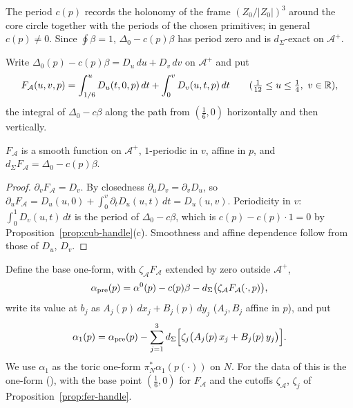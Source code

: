 The period $c(p)$ records the holonomy of the frame $(Z_0/|Z_0|)^3$ around the core circle together with the periods of the
chosen primitives; in general $c(p)\ne0$. Since $\oint\beta=1$, $\Delta_0-c(p)\beta$ has period zero and is $d_\Sigma$-exact on
$\mathcal A^+$.

\begin{definition}\label{def:fer-FA}
Write $\Delta_0(p)-c(p)\beta=D_u\,du+D_v\,dv$ on $\mathcal A^+$ and put
\[
 F_{\mathcal A}(u,v,p)=\int_{1/6}^uD_u(t,0,p)\,dt+\int_0^vD_v(u,t,p)\,dt\qquad(\tfrac1{12}\le u\le\tfrac14,\ v\in\mathbb{R}),
\]
the integral of $\Delta_0-c\beta$ along the path from $(\frac16,0)$ horizontally and then vertically.
\end{definition}

\begin{lemma}\label{lem:fer-FA}
$F_{\mathcal A}$ is a smooth function on $\mathcal A^+$, $1$-periodic in $v$, affine in $p$, and
$d_\Sigma F_{\mathcal A}=\Delta_0-c(p)\beta$.
\end{lemma}

\begin{proof}
$\partial_vF_{\mathcal A}=D_v$. By closedness $\partial_uD_v=\partial_vD_u$, so
$\partial_uF_{\mathcal A}=D_u(u,0)+\int_0^v\partial_tD_u(u,t)\,dt=D_u(u,v)$. Periodicity in $v$: $\int_0^1D_v(u,t)\,dt$ is the period
of $\Delta_0-c\beta$, which is $c(p)-c(p)\cdot1=0$ by Proposition~\ref{prop:cub-handle}(c). Smoothness and affine dependence
follow from those of $D_u$, $D_v$.
\end{proof}

\begin{construction}\label{cons:fer-alpha1}
Define the base one-form, with $\zeta_{\mathcal A}F_{\mathcal A}$ extended by zero outside $\mathcal A^+$,
\[
 \alpha_{\rm pre}(p)=\alpha^0(p)-c(p)\beta-d_\Sigma\big(\zeta_{\mathcal A}F_{\mathcal A}(\cdot,p)\big),
\]
write its value at $b_j$ as $A_j(p)\,dx_j+B_j(p)\,dy_j$ ($A_j,B_j$ affine in $p$), and put
\begin{equation}\label{eq:fer-alpha1}
 \alpha_1(p)=\alpha_{\rm pre}(p)-\sum_{j=1}^3d_\Sigma\Big[\zeta_j\big(A_j(p)\,x_j+B_j(p)\,y_j\big)\Big].
\end{equation}
We use $\alpha_1$ as the toric one-form $\pi_N^*\alpha_1(p(\cdot))$ on $N$. For the data of  this is the
one-form (), with the base point $(\frac16,0)$ for $F_{\mathcal A}$ and the cutoffs
$\zeta_{\mathcal A}$, $\zeta_j$ of Proposition~\ref{prop:fer-handle}.
\end{construction}

